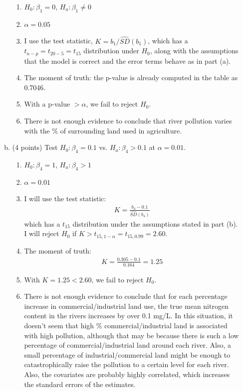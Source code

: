 \documentclass{article}\usepackage{graphicx, color}
\providecommand{\wh}[1]{\widehat{#1}}
\numberwithin{equation}{section}
\begin{document}
\begin{flushleft}
\begin{enumerate}[1. ]
\begin{enumerate}[a. ]
{\begin{enumerate}[1. ]
\item $H_0: \beta_1 = 0$, $H_a: \beta_1 \ne 0$
\item $\alpha = 0.05$
\item I use the test statistic, $K = b_1/ \wh{SD}(b_1)$, which has a $t_{n - p} = t_{20 - 5} = t_{15}$ distribution under $H_0$, along with the assumptions that the model is correct and the error terms behave as in part (a). 
\item The moment of truth: the p-value is already computed in the table as 0.7046.
\item With a p-value $> \alpha$, we fail to reject $H_0$.
\item There is not enough evidence to conclude that river pollution varies with the \% of surrounding land used in agriculture.
\end{enumerate}
}

\item (4 points) Test $H_0: \beta_4 = 0.1$ vs. $H_a: \beta_4 > 0.1$ at $\alpha = 0.01$.


{\color{red}
\begin{enumerate}[1. ]
\item $H_0: \beta_4 = 1$, $H_a: \beta_4 > 1$
\item $\alpha = 0.01$ 
\item I will use the test statistic:
\begin{align*}
K = \frac{b_4 - 0.1}{\wh{SD}(b_4)}
\end{align*}
which has a $t_{15}$ distribution under the assumptions stated in part (b). I will reject $H_0$ if $K > t_{15, 1 - \alpha} = t_{15, 0.99} = 2.60$. 
\item The moment of truth:
\begin{align*}
K = \frac{0.305 - 0.1}{0.164} = 1.25
\end{align*}
\item With $K = 1.25 < 2.60$, we fail to reject $H_0$.
\item There is not enough evidence to conclude that for each percentage increase in commercial/industrial land use, the true mean nitrogen content in the rivers increases by over 0.1 mg/L. In this situation, it doesn't seem that high \% commercial/industrial land is associated with high pollution, although that may be because there is such a low percentage of commercial/industrial land around each river. Also, a small percentage of industrial/commercial land might be enough to catastrophically raise the pollution to a certain level for each river. Also, the covariates are probably highly correlated, which increases the standard errors of the estimates.
\end{enumerate}
}


\end{enumerate}
\end{enumerate}
\end{flushleft}
\end{document}
